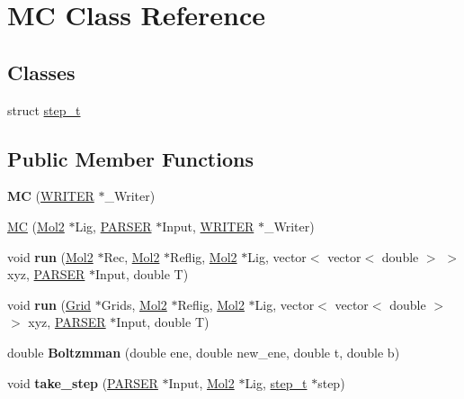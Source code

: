 \hypertarget{classMC}{
\section{MC Class Reference}
\label{classMC}
}
\subsection*{Classes}
\begin{DoxyCompactItemize}
\item 
struct \hyperlink{structMC_1_1step__t}{step\_\-t}
\end{DoxyCompactItemize}
\subsection*{Public Member Functions}
\begin{DoxyCompactItemize}
\item 
\hypertarget{classMC_a4e515b81cf961f9c46b031bcaf490b08}{
{\bfseries MC} (\hyperlink{classWRITER}{WRITER} $\ast$\_\-Writer)}
\label{classMC_a4e515b81cf961f9c46b031bcaf490b08}

\item 
\hyperlink{classMC_ac8c6a1cf2db2bd5582668077b2c22db1}{MC} (\hyperlink{classMol2}{Mol2} $\ast$Lig, \hyperlink{classPARSER}{PARSER} $\ast$Input, \hyperlink{classWRITER}{WRITER} $\ast$\_\-Writer)
\item 
\hypertarget{classMC_acca8ada3c324a4dec02a4065bf1c53cb}{
void {\bfseries run} (\hyperlink{classMol2}{Mol2} $\ast$Rec, \hyperlink{classMol2}{Mol2} $\ast$Reflig, \hyperlink{classMol2}{Mol2} $\ast$Lig, vector$<$ vector$<$ double $>$ $>$ xyz, \hyperlink{classPARSER}{PARSER} $\ast$Input, double T)}
\label{classMC_acca8ada3c324a4dec02a4065bf1c53cb}

\item 
\hypertarget{classMC_a5283879878118cc83628359d7134c0bd}{
void {\bfseries run} (\hyperlink{classGrid}{Grid} $\ast$Grids, \hyperlink{classMol2}{Mol2} $\ast$Reflig, \hyperlink{classMol2}{Mol2} $\ast$Lig, vector$<$ vector$<$ double $>$ $>$ xyz, \hyperlink{classPARSER}{PARSER} $\ast$Input, double T)}
\label{classMC_a5283879878118cc83628359d7134c0bd}

\item 
\hypertarget{classMC_ae4aeb3012bd2b7064f2f2dab00f5fe21}{
double {\bfseries Boltzmman} (double ene, double new\_\-ene, double t, double b)}
\label{classMC_ae4aeb3012bd2b7064f2f2dab00f5fe21}

\item 
\hypertarget{classMC_aa27e241868c8263365f849cdf76d296b}{
void {\bfseries take\_\-step} (\hyperlink{classPARSER}{PARSER} $\ast$Input, \hyperlink{classMol2}{Mol2} $\ast$Lig, \hyperlink{structMC_1_1step__t}{step\_\-t} $\ast$step)}
\label{classMC_aa27e241868c8263365f849cdf76d296b}


\end{DoxyCompactItemize}
